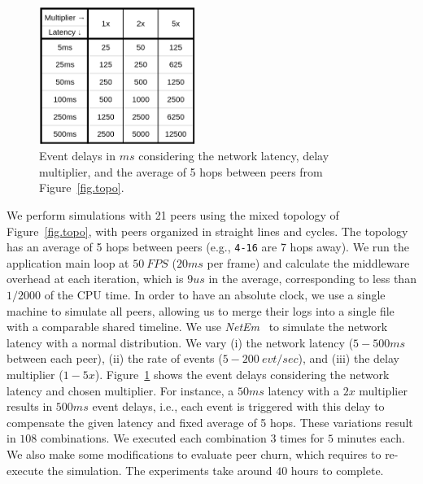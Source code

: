 \documentclass[fleqn,10pt]{SelfArx}
\newcommand{\code}[1]  {\texttt{\footnotesize{#1}}}
\begin{document}
\begin{figure}
  \centering
  \includegraphics[width=2in]{mult}
  \caption{
    \label{fig.mult}
Event delays in $ms$ considering the network latency, delay multiplier, and the
average of 5 hops between peers from Figure~\ref{fig.topo}.
    }
\end{figure}

We perform simulations with 21 peers using the mixed topology of
Figure~\ref{fig.topo}, with peers organized in straight lines and cycles.
The topology has an average of 5 hops between peers (e.g., \code{4-16} are 7
hops away).
%
We run the application main loop at $50~FPS$ ($20ms$ per frame) and calculate
the middleware overhead at each iteration, which is $9us$ in the average,
corresponding to less than $1/2000$ of the CPU time.
%
In order to have an absolute clock, we use a single machine to simulate all
peers, allowing us to merge their logs into a single file with a comparable
shared timeline.
%
We use \emph{NetEm}~\cite{netem} to simulate the network latency with a normal
distribution.
%
We vary
    (i)   the network latency ($5-500ms$ between each peer),
    (ii)  the rate of events ($5-200~evt/sec$), and
    (iii) the delay multiplier ($1-5x$).
%
Figure~\ref{fig.mult} shows the event delays considering the network latency
and chosen multiplier.
For instance, a $50ms$ latency with a $2x$ multiplier results in $500ms$ event
delays, i.e., each event is triggered with this delay to compensate the given
latency and fixed average of 5 hops.
%
These variations result in $108$ combinations.
We executed each combination $3$ times for $5$ minutes each.
We also make some modifications to evaluate peer churn, which requires to
re-execute the simulation.
The experiments take around $40$ hours to complete.

\end{document}
